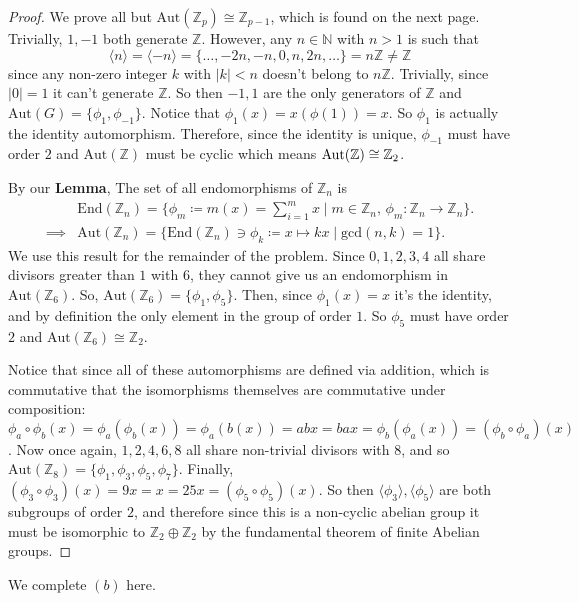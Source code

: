 \documentclass[addpoints,10pt]{exam}
\theoremstyle{plain}
\theoremstyle{definition}
\theoremstyle{plain}
\theoremstyle{plain}
\theoremstyle{definition}
\newcommand{\belowtitle}{\leavevmode\newline}
\newcommand{\NN}{\ensuremath{\mathbb{N}}}
\newcommand{\ZZ}{\ensuremath{\mathbb{Z}}}
\begin{document}
\begin{proof} We prove all but $\mathrm{Aut}(\ZZ_{p})\cong \ZZ_{p-1}$, which is found on the next page. \belowtitle
Trivially, $1,-1$ both generate $\ZZ$. However, any $n\in \NN$ with $n>1$ is such that 
$$\langle n\rangle = \langle -n \rangle = \{\hdots,-2n,-n,0,n,2n,\hdots\}=n\ZZ\neq \ZZ$$
since any non-zero integer $k$ with $|k|<n$ doesn't belong to $n\ZZ.$ Trivially, since $|0|=1$ it can't generate $\ZZ$. So then $-1,1$ are the only generators of $\ZZ$ and $\mathrm{Aut}(G)=\{\phi_{1},\phi_{-1}\}$. Notice that $\phi_{1}(x)=x(\phi(1))=x$. So $\phi_{1}$ is actually the identity automorphism. Therefore, since the identity is unique, $\phi_{-1}$ must have order $2$ and $\mathrm{Aut}(\ZZ)$ must be cyclic which means $\mathrm{Aut}(\ZZ)\cong \ZZ_{2}\newline$.

By our \textbf{Lemma}, The set of all endomorphisms of $\ZZ_{n}$ is
\begin{align*}
  &\mathrm{End}(\ZZ_{n})=\{\phi_{m}\coloneqq m(x)=\sum_{i=1}^{m}x\mid m\in \ZZ_{n},\, \phi_{m}:\ZZ_{n}\to \ZZ_{n}\}.\\ 
  \implies &\mathrm{Aut}(\ZZ_{n})=\{\mathrm{End}(\ZZ_{n})\ni\phi_{k}\coloneqq x\mapsto kx\mid \mathrm{gcd}(n,k)=1\}.
\end{align*}
We use this result for the remainder of the problem. Since $0,1,2,3,4$ all share divisors greater than $1$ with $6$, they cannot give us an endomorphism in $\mathrm{Aut}(\ZZ_{6})$. So, $\mathrm{Aut}(\ZZ_{6})=\{\phi_{1},\phi_{5}\}.$ Then, since $\phi_{1}(x)=x$ it's the identity, and by definition the only element in the group of order $1$. So $\phi_{5}$ must have order $2$ and $\mathrm{Aut}(\ZZ_{6})\cong \ZZ_{2}$.

Notice that since all of these automorphisms are defined via addition, which is commutative that the isomorphisms themselves are commutative under composition: $\phi_{a}\circ \phi_{b}(x)=\phi_{a}(\phi_{b}(x))=\phi_{a}(b(x))=abx=bax=\phi_{b}(\phi_{a}(x))=(\phi_{b}\circ \phi_{a})(x)$. Now once again, $1,2,4,6,8$ all share non-trivial divisors with $8$, and so $\mathrm{Aut}(\ZZ_{8})=\{\phi_{1},\phi_{3},\phi_{5},\phi_{7}\}.$ Finally, $(\phi_{3}\circ \phi_{3})(x)=9x=x=25x=(\phi_{5}\circ\phi_{5})(x)$. So then $\langle \phi_{3} \rangle,\langle \phi_{5} \rangle$ are both subgroups of order $2$, and therefore since this is a non-cyclic abelian group it must be isomorphic to $\ZZ_{2}\oplus \ZZ_{2}$ by the fundamental theorem of finite Abelian groups. 
\end{proof}
\newpage
We complete $(b)$ here.
\end{document}
